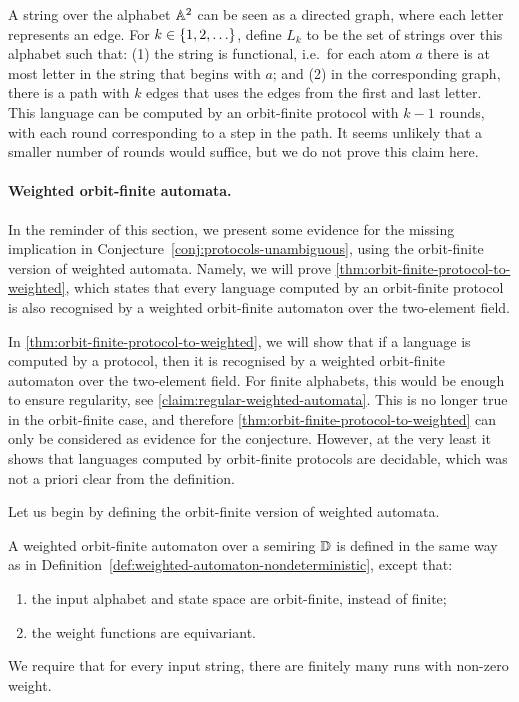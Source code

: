 \begin{myexample}
    A string over the alphabet $\mathbb A^2$ can be seen as a directed graph, where each letter represents an edge. For $k \in \{1,2,\ldots\}$, define  $L_k$ to be the set of strings over this alphabet such that: (1) the string is functional, i.e.~for each atom $a$ there is at most letter in the string that begins with $a$; and (2) in the corresponding graph, there is a path with $k$ edges that uses the edges from the first and last letter. This language can be computed by an orbit-finite protocol with $k-1$ rounds, with each round corresponding to a step in the path. It seems unlikely that a smaller number of rounds would suffice, but we do not prove this claim here. 
\end{myexample}



\paragraph*{Weighted orbit-finite automata.} In the reminder of this section, we present some evidence for the missing implication
in Conjecture~\ref{conj:protocols-unambiguous}, using the orbit-finite version of weighted automata. Namely, we will prove
\cref{thm:orbit-finite-protocol-to-weighted}, which states that every language computed by an orbit-finite protocol is also recognised by a weighted orbit-finite automaton over the two-element field.

 In \cref{thm:orbit-finite-protocol-to-weighted}, we will show  that  if a language is computed by a protocol, then it is recognised by a weighted orbit-finite automaton over the two-element field. For finite alphabets, this would be enough to ensure regularity, see \cref{claim:regular-weighted-automata}. This is no longer true in the orbit-finite case, and therefore \cref{thm:orbit-finite-protocol-to-weighted} can only be considered as evidence for the conjecture. However, at the very least it shows that languages computed by orbit-finite protocols are decidable, which was not a priori clear from the definition.

Let us begin by defining the orbit-finite version of weighted automata. 
\begin{definition}
    \label{def:weighted-orbit-finite-automata}
    A weighted orbit-finite automaton over a semiring $\mathbb D$ is defined in the same way as in Definition~\ref{def:weighted-automaton-nondeterministic}, except that:
    \begin{enumerate}
        \item the input alphabet and state space are orbit-finite, instead of finite;
        \item the weight functions are equivariant.
    \end{enumerate}
     We require that for every input string, there are finitely many runs with non-zero weight.
\end{definition}

